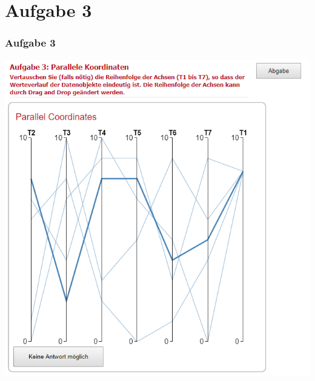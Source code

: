 \documentclass[accentcolor=tud9c,colorbacktitle,inverttitle,landscape,german,presentation,t]{tudbeamer}
\begin{document}
\section{Aufgabe 3}
\begin{frame}
	\frametitle{Aufgabe 3}
	\includegraphics[height=\textheight]{ex11_3.png}
\end{frame}
\end{document}
